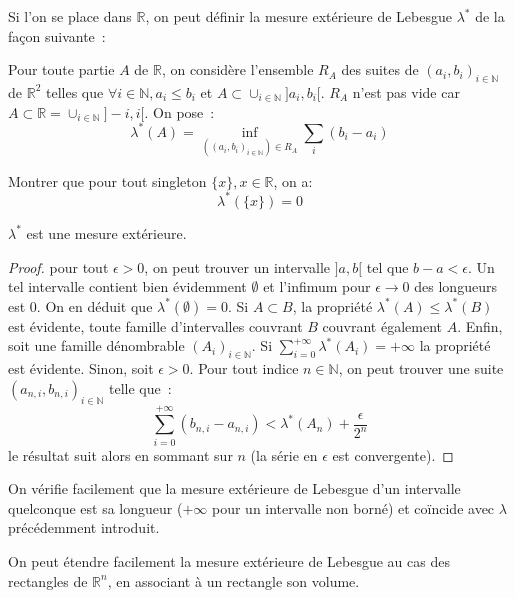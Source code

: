 \begin{mandatory}
Si l'on se place dans $\mathbb{R}$, on peut définir la mesure
extérieure de Lebesgue $\lambda^*$ de la façon suivante~:

 Pour toute partie $A$ de $\mathbb{R}$, on
considère l'ensemble $R_A$ des suites de $(a_i,b_i)_{i \in
  \mathbb{N}}$ de $\mathbb{R}^2$ telles 
que $\forall i \in \mathbb{N}, a_i \leq  b_i$ et $A \subset \cup_{i \in \mathbb{N}} ]a_i, b_i[$. $R_A$ n'est pas
  vide car $A \subset \mathbb{R}  = \cup_{i \in \mathbb{N}} ]-i , i [$.
On pose~:
\[
\lambda^*(A) = \inf_{((a_i,b_i)_{i \in \mathbb{N}}) \in R_A} \sum_i (b_i-a_i)
\]
\end{mandatory}
\begin{exercice}
Montrer que pour tout singleton $\{x\}, x\in \mathbb{R}$, on a: 
\[
\lambda^*\left(\{x\}\right)=0
\]
\end{exercice}
\begin{prop}
$\lambda^*$ est une mesure extérieure.
\end{prop}
\begin{proof}
pour tout $\epsilon > 0$, on peut trouver un intervalle $]a,b[$ tel
que $b-a < \epsilon$. Un tel intervalle contient bien évidemment
$\emptyset$ et l'infimum pour $\epsilon \to 0$ des longueurs est 0. On en
déduit que $\lambda^*(\emptyset)= 0$. Si $A\subset B$, la propriété
$\lambda^*(A) \leq \lambda^*(B)$ est évidente, toute famille
d'intervalles couvrant $B$ couvrant également $A$. Enfin, soit une
famille dénombrable $(A_i)_{i \in \mathbb{N}}$. Si $\sum_{i=0}^{+\infty}
\lambda^*(A_i) = +\infty$ la propriété est évidente. Sinon, soit $\epsilon > 0$. Pour tout indice
$n \in \mathbb{N}$, on peut trouver une suite $(a_{n,i},b_{n,i})_{i
  \in \mathbb{N}}$ telle
que~:
\[
\sum_{i = 0}^{+\infty} (b_{n,i} - a_{n,i}) < \lambda^*(A_n) + \frac{\epsilon}{2^n}
\]
le résultat suit alors en sommant sur $n$ (la série en $\epsilon$ est
convergente).
\end{proof}
On vérifie facilement que la mesure extérieure de Lebesgue d'un
intervalle quelconque est sa longueur ($+\infty$ pour un intervalle non borné)
et coïncide avec $\lambda$ précédemment introduit.

On peut étendre facilement la mesure extérieure de Lebesgue au cas des rectangles
de $\mathbb{R}^n$, en associant à un rectangle son volume.

